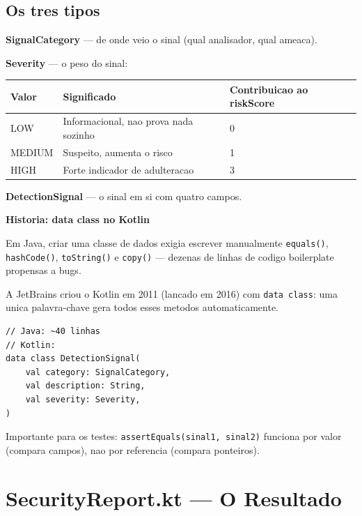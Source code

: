 \documentclass[12pt,a4paper]{article}
\begin{document}
\subsection{Os tres tipos}

\textbf{SignalCategory} --- de onde veio o sinal (qual analisador, qual ameaca).

\textbf{Severity} --- o peso do sinal:

\begin{center}
\begin{tabular}{lll}
\toprule
Valor & Significado & Contribuicao ao riskScore \\
\midrule
LOW & Informacional, nao prova nada sozinho & 0 \\
MEDIUM & Suspeito, aumenta o risco & 1 \\
HIGH & Forte indicador de adulteracao & 3 \\
\bottomrule
\end{tabular}
\end{center}

\textbf{DetectionSignal} --- o sinal em si com quatro campos.

\begin{historybox}
\textbf{Historia: data class no Kotlin}

Em Java, criar uma classe de dados exigia escrever manualmente \texttt{equals()},
\texttt{hashCode()}, \texttt{toString()} e \texttt{copy()} --- dezenas de linhas
de codigo boilerplate propensas a bugs.

A JetBrains criou o Kotlin em 2011 (lancado em 2016) com \texttt{data class}:
uma unica palavra-chave gera todos esses metodos automaticamente.

\begin{lstlisting}
// Java: ~40 linhas
// Kotlin:
data class DetectionSignal(
    val category: SignalCategory,
    val description: String,
    val severity: Severity,
)
\end{lstlisting}

Importante para os testes: \texttt{assertEquals(sinal1, sinal2)} funciona
por valor (compara campos), nao por referencia (compara ponteiros).
\end{historybox}

\newpage

\section{SecurityReport.kt --- O Resultado}
\end{document}
